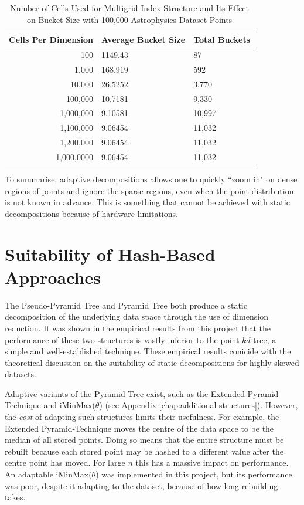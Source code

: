 \begin{table}
	\centering
	\begin{tabular}{|r|l|l|}
	\hline
	\textbf{Cells Per Dimension} & \textbf{Average Bucket Size} & \textbf{Total Buckets} \\
	\hline
	100 & 1149.43 & 87 \\
	1,000 & 168.919 & 592 \\
	10,000 & 26.5252 & 3,770 \\
	100,000 & 10.7181 & 9,330 \\
	1,000,000 & 9.10581 & 10,997 \\
	1,100,000 & 9.06454 & 11,032 \\
	1,200,000 & 9.06454 & 11,032 \\
	1,000,0000 & 9.06454 & 11,032 \\
	\hline
	\end{tabular}
	\caption{Number of Cells Used for Multigrid Index Structure and Its Effect on Bucket Size with 100,000 Astrophysics Dataset Points}
	\label{tab:cell-size-effect}
\end{table}

To summarise, adaptive decompositions allows one to quickly ``zoom in" on dense regions of points and ignore the sparse regions, even when the point distribution is not known in advance. This is something that cannot be achieved with static decompositions because of hardware limitations.

\section{Suitability of Hash-Based Approaches}
	
The Pseudo-Pyramid Tree and Pyramid Tree both produce a static decomposition of the underlying data space through the use of dimension reduction. It was shown in the empirical results from this project that the performance of these two structures is vastly inferior to the point $kd$-tree, a simple and well-established technique. These empirical results conicide with the theoretical discussion on the suitability of static decompositions for highly skewed datasets.

Adaptive variants of the Pyramid Tree exist, such as the Extended Pyramid-Technique \cite{pyramid-tree} and iMinMax($\theta$) (see Appendix \ref{chap:additional-structures}). However, the \textit{cost} of adapting such structures limits their usefulness. For example, the Extended Pyramid-Technique moves the centre of the data space to be the median of all stored points. Doing so means that the entire structure must be rebuilt because each stored point may be hashed to a different value after the centre point has moved. For large $n$ this has a massive impact on performance. An adaptable iMinMax($\theta$) was implemented in this project, but its performance was poor, despite it adapting to the dataset, because of how long rebuilding takes.


